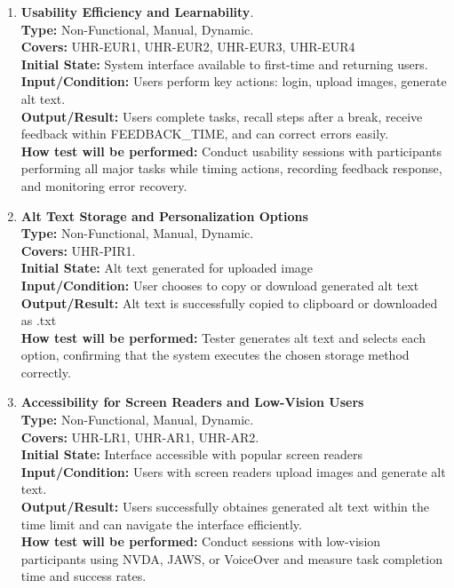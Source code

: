 \documentclass[12pt, titlepage]{article}
\begin{document}
\begin{enumerate}[label=NFR-ST \arabic*., wide=0pt, leftmargin=*]
  \item \textbf{Usability Efficiency and Learnability}. \\[2mm]
    \textbf{Type:} Non-Functional, Manual, Dynamic. \\
    \textbf{Covers:} UHR-EUR1, UHR-EUR2, UHR-EUR3, UHR-EUR4 \\
    \textbf{Initial State:} System interface available to first-time
    and returning users. \\
    \textbf{Input/Condition:} Users perform key actions: login,
    upload images, generate alt text. \\
    \textbf{Output/Result:} Users complete tasks, recall
    steps after a break, receive feedback within FEEDBACK\_TIME, and can
    correct errors easily. \\[2mm]
    \textbf{How test will be performed:} Conduct usability sessions
    with participants performing all major tasks while timing
    actions, recording feedback response, and monitoring error recovery.

  \item \textbf{Alt Text Storage and Personalization Options} \\[2mm]
    \textbf{Type:} Non-Functional, Manual, Dynamic. \\
    \textbf{Covers:} UHR-PIR1. \\
    \textbf{Initial State:} Alt text generated for uploaded image \\
    \textbf{Input/Condition:} User chooses to copy or download
    generated alt text \\
    \textbf{Output/Result:} Alt text is successfully copied to
    clipboard or downloaded as .txt \\[2mm]
    \textbf{How test will be performed:} Tester generates alt text
    and selects each option, confirming that the system executes the
    chosen storage method correctly.

  \item \textbf{Accessibility for Screen Readers and Low-Vision Users} \\[2mm]
    \textbf{Type:} Non-Functional, Manual, Dynamic. \\
    \textbf{Covers:} UHR-LR1, UHR-AR1, UHR-AR2.\\
    \textbf{Initial State:} Interface accessible with popular screen readers \\
    \textbf{Input/Condition:} Users with screen readers upload images
    and generate alt text. \\
    \textbf{Output/Result:} Users successfully obtaines generated alt text
    within the time limit and can navigate the interface efficiently. \\[2mm]
    \textbf{How test will be performed:} Conduct sessions with
    low-vision participants using NVDA, JAWS, or VoiceOver and
    measure task completion time and success rates.


\end{enumerate}
\end{document}
